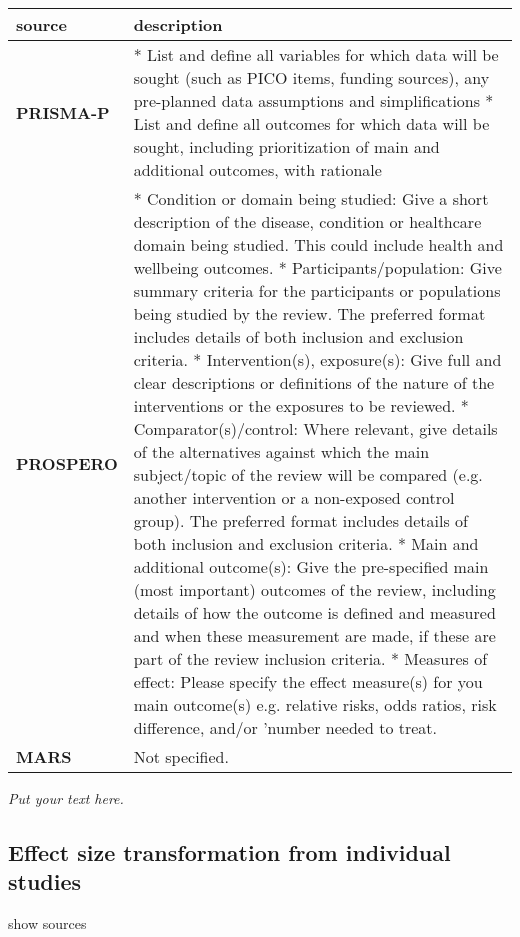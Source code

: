 \documentclass[]{article}
\begin{document}
\hypertarget{ladodaie}{}
\begin{table}[H]
\centering
\begin{tabular}{>{\bfseries}l|l}
\hline
\rowcolor[HTML]{ececec}  source & description\\
\hline
PRISMA-P & * List and define all variables for which data will be sought (such as PICO items, funding sources), any pre-planned data assumptions and simplifications
* List and define all outcomes for which data will be sought, including prioritization of main and additional outcomes, with rationale\\
\hline
PROSPERO & * Condition or domain being studied: Give a short description of the disease, condition or healthcare domain being studied. This could include health and wellbeing outcomes.
* Participants/population: Give summary criteria for the participants or populations being studied by the review. The preferred format includes details of both inclusion and exclusion criteria.
* Intervention(s), exposure(s): Give full and clear descriptions or definitions of the nature of the interventions or the exposures to be reviewed.
* Comparator(s)/control: Where relevant, give details of the alternatives against which the main subject/topic of the review will be compared (e.g. another intervention or a non-exposed control group). The preferred format includes details of both inclusion and exclusion criteria.
* Main and additional outcome(s): Give the pre-specified main (most important) outcomes of the review, including details of how the outcome is defined and measured and when these measurement are made, if these are part of the review inclusion criteria.
* Measures of effect: Please specify the effect measure(s) for you main outcome(s) e.g. relative risks, odds ratios, risk difference,
and/or 'number needed to treat.\\
\hline
MARS & Not specified.\\
\hline
\end{tabular}
\end{table}

\emph{Put your text here.}

\hypertarget{effect-size-transformation-from-individual-studies}{%
\subsection{Effect size transformation from individual
studies}\label{effect-size-transformation-from-individual-studies}}

show sources
\end{document}
